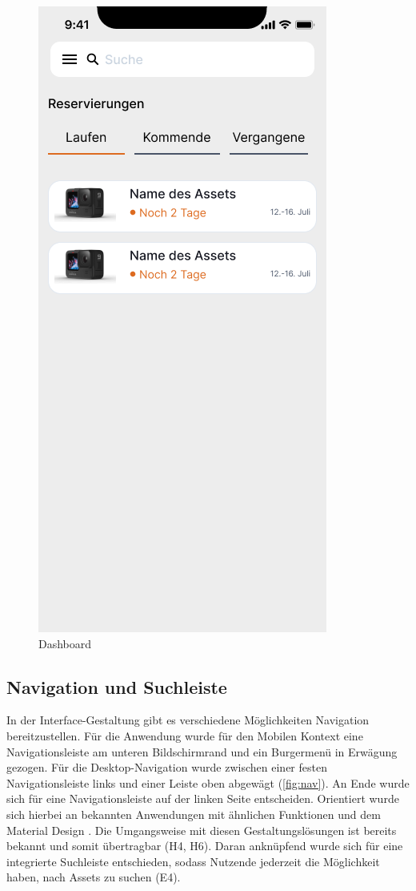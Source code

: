 \begin{figure}[h]
    \includegraphics[scale=0.3]{Bilder/Prototyp/Neu/V2.png}
    \caption[-]{Dashboard}
    \label{fig:home}
\end{figure}

\subsection{Navigation und Suchleiste}
In der Interface-Gestaltung gibt es verschiedene Möglichkeiten Navigation bereitzustellen. Für die
Anwendung wurde für den Mobilen Kontext eine Navigationsleiste am unteren Bildschirmrand und ein
Burgermenü in Erwägung gezogen. Für die Desktop-Navigation wurde zwischen einer festen
Navigationsleiste links und einer Leiste oben abgewägt (\ref{fig:nav}). An Ende wurde sich für eine
Navigationsleiste auf der linken Seite entscheiden. Orientiert wurde sich hierbei an bekannten
Anwendungen mit ähnlichen Funktionen und dem Material Design \cite{google_material_2022}. Die
Umgangsweise mit diesen Gestaltungslösungen ist bereits bekannt und somit übertragbar (H4, H6).
Daran anknüpfend wurde sich für eine integrierte Suchleiste entschieden, sodass Nutzende jederzeit
die Möglichkeit haben, nach Assets zu suchen \cite{google_material_2022} (E4).


